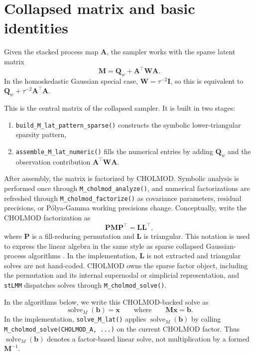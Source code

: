 \documentclass[11pt]{article}
\newcommand{\bb}{\bm{b}}
\newcommand{\bx}{\bm{x}}
\newcommand{\bA}{\bm{A}}
\newcommand{\bI}{\bm{I}}
\newcommand{\bL}{\bm{L}}
\newcommand{\bM}{\bm{M}}
\newcommand{\bP}{\bm{P}}
\newcommand{\bQ}{\bm{Q}}
\newcommand{\bW}{\bm{W}}
\newcommand{\trans}{^\top}
\begin{document}
\section{Collapsed matrix and basic identities}

Given the stacked process map $\bA$, the sampler works with the sparse latent matrix
\begin{equation}
  \label{eq:M-lat}
  \bM = \bQ_w + \bA\trans \bW \bA.
\end{equation}
In the homoskedastic Gaussian special case, $\bW=\tau^{-2}\bI$, so this is equivalent to $\bQ_w + \tau^{-2}\bA\trans \bA$.

This is the central matrix of the collapsed sampler. It is built in two stages:
\begin{enumerate}
\item \texttt{build\_M\_lat\_pattern\_sparse()} constructs the symbolic lower-triangular sparsity pattern,
\item \texttt{assemble\_M\_lat\_numeric()} fills the numerical entries by adding $\bQ_w$ and the observation contribution $\bA\trans \bW \bA$.
\end{enumerate}

After assembly, the matrix is factorized by CHOLMOD. Symbolic analysis is performed once through \texttt{M\_cholmod\_analyze()}, and numerical factorizations are refreshed through \texttt{M\_cholmod\_factorize()} as covariance parameters, residual precisions, or P{\'o}lya-Gamma working precisions change. Conceptually, write the CHOLMOD factorization as
\begin{equation}
  \label{eq:M-factor}
  \bP\bM\bP\trans=\bL\bL\trans,
\end{equation}
where $\bP$ is a fill-reducing permutation and $\bL$ is triangular. This notation is used to express the linear algebra in the same style as sparse collapsed Gaussian-process algorithms \citep[see, e.g.,][Section~2.1]{Finley2019}. In the implementation, $\bL$ is not extracted and triangular solves are not hand-coded. CHOLMOD owns the sparse factor object, including the permutation and its internal supernodal or simplicial representation, and \texttt{stLMM} dispatches solves through \texttt{M\_cholmod\_solve()}.

In the algorithms below, we write this CHOLMOD-backed solve as
\begin{equation}
  \label{eq:solve-M-def}
  \operatorname{solve}_M(\bb)=\bx
  \qquad\text{where}\qquad
  \bM\bx=\bb .
\end{equation}
In the implementation, \texttt{solve\_M\_lat()} applies
$\operatorname{solve}_M(\bb)$ by calling
\texttt{M\_cholmod\_solve(CHOLMOD\_A, ...)} on the current CHOLMOD
factor. Thus $\operatorname{solve}_M(\bb)$ denotes a factor-based
linear solve, not multiplication by a formed $\bM^{-1}$.
\end{document}
